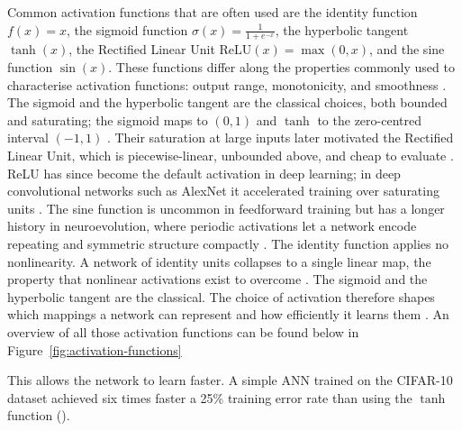 \documentclass[12pt]{article}
\begin{document}
Common activation functions that are often used are the identity function $f(x)=x$, the sigmoid function $\sigma(x)=\frac{1}{1+e^{-x}}$, the hyperbolic tangent $\tanh(x)$, the Rectified Linear Unit $\mathrm{ReLU}(x)=\max(0,x)$, and the sine function $\sin(x)$. These functions differ along the properties commonly used to characterise activation functions: output range, monotonicity, and smoothness \textcite{dubey_activation_2022}. The sigmoid and the hyperbolic tangent are the classical
choices, both bounded and saturating; the sigmoid maps to $(0,1)$ and $\tanh$
to the zero-centred interval $(-1,1)$ \cite{dubey_activation_2022}. Their saturation at
large inputs later motivated the Rectified Linear Unit, which is
piecewise-linear, unbounded above, and cheap to evaluate \textcite{nair_rectified_2010}. ReLU
has since become the default activation in deep learning; in deep convolutional
networks such as AlexNet it accelerated training over saturating units
\textcite{krizhevsky_imagenet_2012,ramachandran_searching_2017}. The sine function is uncommon in
feedforward training but has a longer history in neuroevolution, where periodic
activations let a network encode repeating and symmetric structure compactly
\cite{stanley_compositional_2007}. The identity function applies no nonlinearity. A network of
identity units collapses to a single linear map, the property that nonlinear
activations exist to overcome \textcite{dubey_activation_2022}. The sigmoid and the hyperbolic tangent are the classical.
The choice of activation therefore shapes which mappings a network can represent and how efficiently it
learns them \textcite{dubey_activation_2022}. An overview of all those activation functions can be found below in Figure~\ref{fig:activation-functions}

This allows the network to learn faster. A simple ANN trained on the CIFAR-10 dataset achieved six times faster a 25\% training error rate than using the $\tanh$ function (\cite{krizhevsky_imagenet_2012}). 

\end{document}
